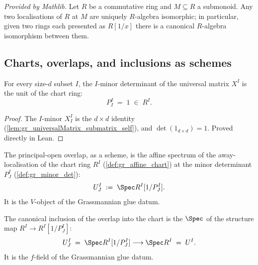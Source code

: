 \begin{lemma}
  \label{lem:mathlib_isLocalization_algEquiv}
  \mathlibok
  \textit{Provided by Mathlib.}
  Let \(R\) be a commutative ring and \(M \subseteq R\) a submonoid. Any two
  localisations of \(R\) at \(M\) are uniquely \(R\)-algebra isomorphic; in
  particular, given two rings each presented as \(R[1/x]\) there is a canonical
  \(R\)-algebra isomorphism between them.
\end{lemma}

\subsection*{Charts, overlaps, and inclusions as schemes}

\begin{theorem}

  \label{lem:gr_minorDet_self}
  For every size-\(d\) subset \(I\), the \(I\)-minor determinant of the universal
  matrix \(X^I\) is the unit of the chart ring:
  \[
    P^I_I \;=\; 1 \;\in\; R^I.
  \]
\end{theorem}
\begin{proof}
  \leanok
  The \(I\)-minor \(X^I_I\) is the \(d \times d\) identity
  (\cref{lem:gr_universalMatrix_submatrix_self}), and \(\det(1_{d\times d}) = 1\).
  Proved directly in Lean.
\end{proof}

\begin{definition}

  \label{def:gr_chart_overlap}
  The principal-open overlap, as a scheme, is the affine spectrum of the
  away-localisation of the chart ring \(R^I\) (\cref{def:gr_affine_chart}) at the
  minor determinant \(P^I_J\) (\cref{def:gr_minor_det}):
  \[
    U^I_J \;:=\; \Spec R^I[1/P^I_J].
  \]
  It is the \(V\)-object of the Grassmannian glue datum.
\end{definition}

\begin{definition}

  \label{def:gr_chart_incl}
  The canonical inclusion of the overlap into the chart is the \(\Spec\) of the
  structure map \(R^I \to R^I[1/P^I_J]\):
  \[
    U^I_J \;=\; \Spec R^I[1/P^I_J] \longrightarrow \Spec R^I \;=\; U^I .
  \]
  It is the \(f\)-field of the Grassmannian glue datum.
\end{definition}

